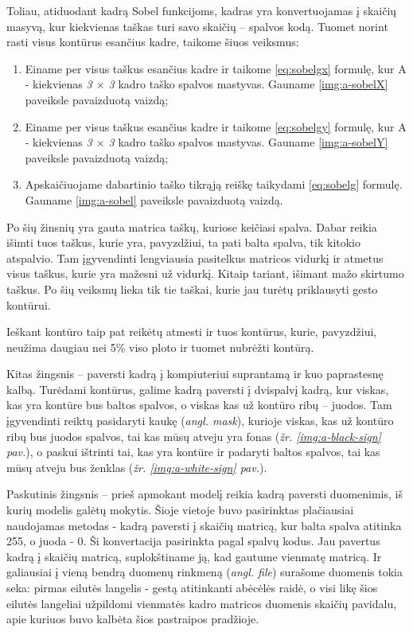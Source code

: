 \documentclass{VUMIFInfKursinis}
\begin{document}
Toliau, atiduodant kadrą Sobel funkcijoms, kadras yra konvertuojamas į skaičių masyvą, kur kiekvienas taškas turi savo skaičių – spalvos kodą. Tuomet norint rasti visus kontūrus esančius kadre, taikome šiuos veiksmus:

\begin{enumerate}
	\item Einame per visus taškus esančius kadre ir taikome \ref{eq:sobelgx} formulę, kur A - kiekvienas \textit{3 $\times$ 3} kadro taško spalvos mastyvas. Gauname \ref{img:a-sobelX} paveiksle pavaizduotą vaizdą;
	\item Einame per visus taškus esančius kadre ir taikome \ref{eq:sobelgy} formulę, kur A - kiekvienas \textit{3 $\times$ 3} kadro taško spalvos mastyvas. Gauname \ref{img:a-sobelY} paveiksle pavaizduotą vaizdą;
	\item Apskaičiuojame dabartinio taško tikrąją reiškę taikydami \ref{eq:sobelg} formulę. Gauname \ref{img:a-sobel} paveiksle pavaizduotą vaizdą.
\end{enumerate}

Po šių žinsnių yra gauta matrica taškų, kuriose keičiasi spalva. Dabar reikia išimti tuos taškus, kurie yra, pavyzdžiui, ta pati balta spalva, tik kitokio atspalvio. Tam įgyvendinti lengviausia pasitelkus matricos vidurkį ir atmetus visus taškus, kurie yra mažesni už vidurkį. Kitaip tariant, išimant mažo skirtumo taškus. Po šių veiksmų lieka tik tie taškai, kurie jau turėtų priklausyti gesto kontūrui.

Ieškant kontūro taip pat reikėtų atmesti ir tuos kontūrus, kurie, pavyzdžiui, neužima daugiau nei 5\% viso ploto ir tuomet nubrėžti kontūrą.

Kitas žingsnis – paversti kadrą į kompiuteriui suprantamą ir kuo paprastesnę kalbą. Turėdami kontūrus, galime kadrą paversti į dvispalvį kadrą, kur viskas, kas yra kontūre bus baltos spalvos, o viskas kas už kontūro ribų – juodos. Tam įgyvendinti reiktų pasidaryti kaukę (\textit{angl. mask}), kurioje viskas, kas už kontūro ribų bus juodos spalvos, tai kas mūsų atveju yra fonas (\textit{žr. \ref{img:a-black-sign} pav.}), o paskui ištrinti tai, kas yra kontūre ir padaryti baltos spalvos, tai kas mūsų atveju bus ženklas (\textit{žr. \ref{img:a-white-sign} pav.}).

Paskutinis žingsnis – prieš apmokant modelį reikia kadrą paversti duomenimis, iš kurių modelis galėtų mokytis. Šioje vietoje buvo pasirinktas plačiausiai naudojamas metodas - kadrą paversti į skaičių matricą, kur balta spalva atitinka 255, o juoda - 0. Ši konvertacija pasirinkta pagal spalvų kodus. Jau pavertus kadrą į skaičių matricą, suplokštiname ją, kad gautume vienmatę matricą. Ir galiausiai į vieną bendrą duomenų rinkmeną (\textit{angl. file}) surašome duomenis tokia seka: pirmas eilutės langelis - gestą atitinkanti abėcėlės raidė, o visi likę šios eilutės langeliai užpildomi vienmatės kadro matricos duomenis skaičių pavidalu, apie kuriuos buvo kalbėta šios pastraipos pradžioje.
\end{document}
